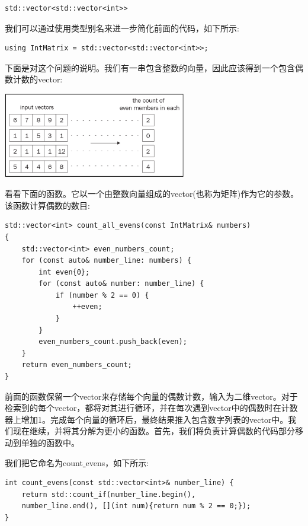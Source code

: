 \begin{lstlisting}[caption={}]
std::vector<std::vector<int>>
\end{lstlisting}

我们可以通过使用类型别名来进一步简化前面的代码，如下所示: \par

\begin{lstlisting}[caption={}]
using IntMatrix = std::vector<std::vector<int>>;
\end{lstlisting}

下面是对这个问题的说明。我们有一串包含整数的向量，因此应该得到一个包含偶数计数的vector: \par

\begin{center}
	\includegraphics[width=0.6\textwidth]{content/Section-2/Chapter-7/1}
\end{center}

看看下面的函数。它以一个由整数向量组成的vector(也称为矩阵)作为它的参数。该函数计算偶数的数目: \par

\begin{lstlisting}[caption={}]
std::vector<int> count_all_evens(const IntMatrix& numbers)
{
	std::vector<int> even_numbers_count;
	for (const auto& number_line: numbers) {
		int even{0};
		for (const auto& number: number_line) {
			if (number % 2 == 0) {
				++even;
			}
		}
		even_numbers_count.push_back(even);
	}
	return even_numbers_count;
}
\end{lstlisting}

前面的函数保留一个vector来存储每个向量的偶数计数，输入为二维vector。对于检索到的每个vector，都将对其进行循环，并在每次遇到vector中的偶数时在计数器上增加1。完成每个向量的循环后，最终结果推入包含数字列表的vector中。我们现在继续，并将其分解为更小的函数。首先，我们将负责计算偶数的代码部分移动到单独的函数中。 \par
我们把它命名为count\underline{ }evens，如下所示: \par

\begin{lstlisting}[caption={}]
int count_evens(const std::vector<int>& number_line) {
	return std::count_if(number_line.begin(),
	number_line.end(), [](int num){return num % 2 == 0;});
}
\end{lstlisting}

